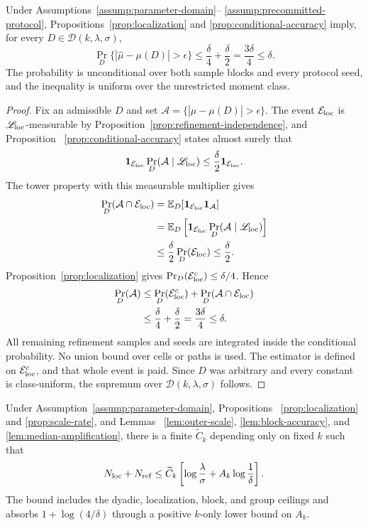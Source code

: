 \begin{proposition}
\label{prop:unconditional-pac}
Under Assumptions~\ref{assump:parameter-domain}--
\ref{assump:precommitted-protocol}, Propositions~\ref{prop:localization} and
\ref{prop:conditional-accuracy} imply, for every
$D\in\mathcal D(k,\lambda,\sigma)$,
\[
 \Pr_D\{|\widehat\mu-\mu(D)|>\epsilon\}
 \leq\frac\delta4+\frac\delta2
 =\frac{3\delta}{4}\leq\delta.
\]
The probability is unconditional over both sample blocks and every protocol
seed, and the inequality is uniform over the unrestricted moment class.
\end{proposition}

\begin{proof}
Fix an admissible $D$ and set
$\mathcal A=\{|\widehat\mu-\mu(D)|>\epsilon\}$.  The event
$\mathcal E_{\rm loc}$ is $\mathscr L_{\rm loc}$-measurable by
Proposition~\ref{prop:refinement-independence}, and Proposition~
\ref{prop:conditional-accuracy} states almost surely that
\[
 \mathbf1_{\mathcal E_{\rm loc}}
 \Pr_D(\mathcal A\mid\mathscr L_{\rm loc})
 \leq\frac\delta2\mathbf1_{\mathcal E_{\rm loc}}.
\]
The tower property with this measurable multiplier gives
\[
\begin{aligned}
 \Pr_D(\mathcal A\cap\mathcal E_{\rm loc})
 &=\mathbb E_D[\mathbf1_{\mathcal E_{\rm loc}}\mathbf1_{\mathcal A}]\\
 &=\mathbb E_D\left[\mathbf1_{\mathcal E_{\rm loc}}
   \Pr_D(\mathcal A\mid\mathscr L_{\rm loc})\right]\\
 &\leq\frac\delta2\Pr_D(\mathcal E_{\rm loc})\leq\frac\delta2.
\end{aligned}
\]
Proposition~\ref{prop:localization} gives
$\Pr_D(\mathcal E_{\rm loc}^c)\leq\delta/4$.  Hence
\[
\begin{aligned}
 \Pr_D(\mathcal A)
 &\leq\Pr_D(\mathcal E_{\rm loc}^c)
 +\Pr_D(\mathcal A\cap\mathcal E_{\rm loc})\\
 &\leq\frac\delta4+\frac\delta2
 =\frac{3\delta}{4}\leq\delta.
\end{aligned}
\]
All remaining refinement samples and seeds are integrated inside the
conditional probability.  No union bound over cells or paths is used.  The
estimator is defined on $\mathcal E_{\rm loc}^c$, and that whole event is
paid.  Since $D$ was arbitrary and every constant is class-uniform, the
supremum over $\mathcal D(k,\lambda,\sigma)$ follows.
\end{proof}

\begin{proposition}
\label{prop:technical-count}
Under Assumption~\ref{assump:parameter-domain}, Propositions~
\ref{prop:localization} and \ref{prop:scale-rate}, and Lemmas~
\ref{lem:outer-scale}, \ref{lem:block-accuracy}, and
\ref{lem:median-amplification}, there is a finite $\widetilde C_k$ depending
only on fixed $k$ such that
\[
 N_{\rm loc}+N_{\rm ref}
 \leq\widetilde C_k\left[
 \log\frac\lambda\sigma+A_k\log\frac1\delta\right].
\]
The bound includes the dyadic, localization, block, and group ceilings and
absorbs $1+\log(4/\delta)$ through a positive $k$-only lower bound on $A_k$.
\end{proposition}

